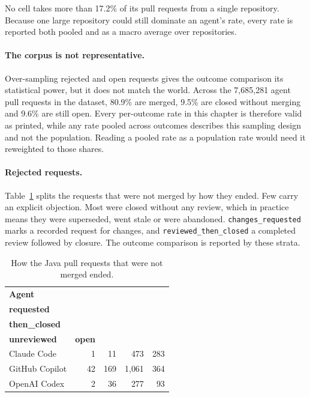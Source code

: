 No cell takes more than 17.2\% of its pull requests from a single repository. Because one large
repository could still dominate an agent's rate, every rate is reported both pooled and as a macro
average over repositories.

\paragraph{The corpus is not representative.} Over-sampling rejected and open requests gives the
outcome comparison its statistical power, but it does not match the world. Across the 7{,}685{,}281 agent pull requests in the dataset, 80.9\% are merged, 9.5\%
are closed without merging and 9.6\% are still open. Every per-outcome rate in this chapter is
therefore valid as printed, while any rate pooled across outcomes describes this sampling design and
not the population. Reading a pooled rate as a population rate would need it reweighted to those
shares.

\paragraph{Rejected requests.} Table~\ref{tab:rejection-strata} splits the requests that were not
merged by how they ended. Few carry an explicit objection. Most were closed without any review,
which in practice means they were superseded, went stale or were abandoned.
\texttt{changes\_requested} marks a recorded request for changes, and
\texttt{reviewed\_then\_closed} a completed review followed by closure. The outcome comparison is
reported by these strata.

\begin{table}[htb]
\centering
\caption{How the Java pull requests that were not merged ended.}
\label{tab:rejection-strata}
\begin{tabular}{@{}lrrrr@{}}
\toprule
\textbf{Agent} & \shortstack[r]{\textbf{changes\_}\\\textbf{requested}} &
\shortstack[r]{\textbf{reviewed\_}\\\textbf{then\_closed}} &
\shortstack[r]{\textbf{closed\_}\\\textbf{unreviewed}} & \textbf{open} \\
\midrule
Claude Code    &  1 &  11 &   473 & 283 \\
GitHub Copilot & 42 & 169 & 1{,}061 & 364 \\
OpenAI Codex   &  2 &  36 &   277 &  93 \\
\bottomrule
\end{tabular}
\end{table}

